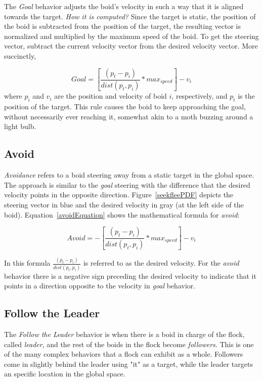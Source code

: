 The \textit{Goal} behavior adjusts the boid's velocity in such a way that it is aligned towards the target. \textit{How it is computed?} Since the target is static, the position of the boid is subtracted from the position of the target, the resulting vector is normalized and multiplied by the maximum speed of the boid. To get the steering vector, subtract the current velocity vector from the desired velocity vector. More succinctly, 

\begin{equation}
\label{goalEquation}
Goal = \left[\frac{(p_t - p_i)}{dist(p_t,p_i)} * max_{speed} \right] - v_i
\end{equation}
where $p_i$ and $v_i$ are the position and velocity of boid $i$, respectively, and $p_t$ is the position of the target. This rule causes the boid to keep approaching the goal, without necessarily ever reaching it, somewhat akin to a moth buzzing around a light bulb.

\subsection{Avoid}
\textit{Avoidance} refers to a boid steering away from a static target in the global space. The approach is similar to the \textit{goal} steering with the difference that the desired velocity points in the opposite direction. Figure~\ref{seekfleePDF} depicts the steering vector in blue and the desired velocity in gray (at the left side of the boid). Equation~\ref{avoidEquation} shows the mathematical formula for \textit{avoid}:

\begin{equation}
\label{avoidEquation}
Avoid = -\left[\frac{(p_t - p_i)}{dist(p_t,p_i)} * max_{speed} \right] - v_i
\end{equation}

In this formula $\frac{(p_t - p_i)}{dist(p_t,p_i)}$ is referred to as the desired velocity. For the \textit{avoid} behavior there is a negative sign preceding the desired velocity to indicate that it points in a direction opposite to the velocity in \textit{goal} behavior.

\subsection{Follow the Leader}
The \textit{Follow the Leader} behavior is when there is a boid in charge of the flock, called \textit{leader}, and the rest of the boids in the flock become \textit{followers}. This is one of the many complex behaviors that a flock can exhibit as a whole. Followers come in slightly behind the leader using "it" as a target, while the leader targets an specific location in the global space.

